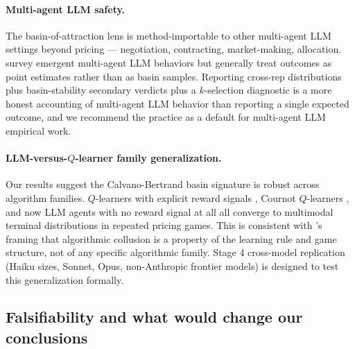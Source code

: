 \paragraph{Multi-agent LLM safety.}
The basin-of-attraction lens is method-importable to other multi-agent LLM settings beyond pricing --- negotiation, contracting, market-making, allocation. \citet{Hammond_2025_multiagent_risks,Riedl_2025_emergent} survey emergent multi-agent LLM behaviors but generally treat outcomes as point estimates rather than as basin samples. Reporting cross-rep distributions plus basin-stability secondary verdicts plus a $k$-selection diagnostic is a more honest accounting of multi-agent LLM behavior than reporting a single expected outcome, and we recommend the practice as a default for multi-agent LLM empirical work.

\paragraph{LLM-versus-$Q$-learner family generalization.}
Our results suggest the Calvano-Bertrand basin signature is robust across algorithm families. $Q$-learners with explicit reward signals \citep{calvano_etal_2020_ai_algorithmic_pricing_collusion}, Cournot $Q$-learners \citep{waltman_kaymak_2008_qlearning_cournot}, and now LLM agents with no reward signal at all all converge to multimodal terminal distributions in repeated pricing games. This is consistent with \citet{asker2021ai_pricing}'s framing that algorithmic collusion is a property of the learning rule and game structure, not of any specific algorithmic family. Stage 4 cross-model replication (Haiku sizes, Sonnet, Opus, non-Anthropic frontier models) is designed to test this generalization formally.

\subsection{Falsifiability and what would change our conclusions}
\label{sec:discussion-falsifiability}

